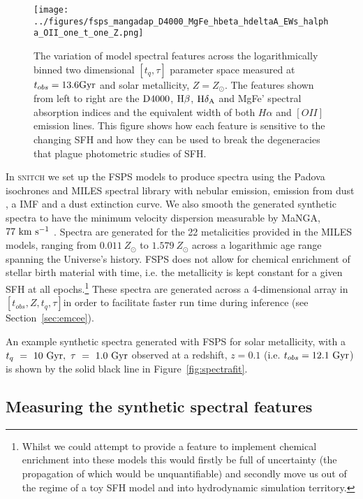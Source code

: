 \documentclass[useAMS,usenatbib]{mn2e}
\def\check		{\color{check}}
\begin{document}
\begin{figure*}
\centering
\texttt{[image: ../figures/fsps\_mangadap\_D4000\_MgFe\_hbeta\_hdeltaA\_EWs\_halpha\_OII\_one\_t\_one\_Z.png]}
\caption{The variation of model spectral features across the logarithmically binned two dimensional $[t_q, \tau]$ parameter space measured at $t_{obs}=13.6\rm{Gyr}$ and solar metallicity, $Z=Z_{\odot}$. The features shown from left to right are the $\rm{D}4000$, $\rm{H}\beta$, $\rm{H}\delta_A$ and MgFe' spectral absorption indices and the equivalent width of both $H\alpha$ and $[OII]$ emission lines. This figure shows how each feature is sensitive to the changing SFH and how they can be used to break the degeneracies that plague photometric studies of SFH. }
\label{fig:rainbow}
\end{figure*}



In \textsc{snitch} we set up the FSPS models to produce spectra using the Padova isochrones \citep{girardi02} and MILES spectral library \citep{vazdekis16} with nebular emission, emission from dust \cite{draineli07}, a \cite{chabrier03} IMF and a \cite{calzetti00} dust extinction curve. We also smooth the generated synthetic spectra to have the minimum velocity dispersion measurable by MaNGA, $77~\rm{km}~{s}^{-1}$ \citep{bundy15}. Spectra are generated for the 22 metalicities provided in the MILES models, ranging from $0.011~Z_{\odot}$ to $1.579~Z_{\odot}$ across a logarithmic age range spanning the Universe's history. FSPS does not allow for chemical enrichment of stellar birth material with time, i.e. the metallicity is kept constant for a given SFH at all epochs.\footnote{Whilst we could attempt to provide a feature to implement chemical enrichment into these models this would firstly be full of uncertainty (the propagation of which would be unquantifiable) and secondly move us out of the regime of a toy SFH model and into hydrodynamic simulation territory. } These spectra are generated across a 4-dimensional array in $[t_{obs}, Z, t_q, \tau]$in order to facilitate faster run time during inference (see Section~\ref{sec:emcee}).

An example synthetic spectra generated with FSPS for solar metallicity, with a {\check $t_q~=~10~\rm{Gyr},~\tau~=~1.0~\rm{Gyr}$ observed at a redshift, $z=0.1$ (i.e. $t_{obs}=12.1~\rm{Gyr}$)} is shown by the solid black line in Figure~\ref{fig:spectrafit}.

\subsection{Measuring the synthetic spectral features}\label{sec:dap}
\end{document}
